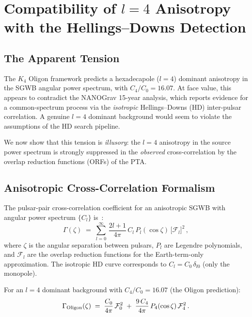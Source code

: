 \section{Compatibility of $l=4$ Anisotropy with the Hellings--Downs Detection}
\label{sec:anisotropy_hd}

\subsection{The Apparent Tension}

The $K_4$ Oligon framework predicts a hexadecapole ($l=4$) dominant anisotropy in the SGWB angular power spectrum, with $C_4/C_0 = 16.07$.  At face value, this appears to contradict the NANOGrav 15-year analysis, which reports evidence for a common-spectrum process via the \emph{isotropic} Hellings--Downs (HD) inter-pulsar correlation.  A genuine $l = 4$ dominant background would seem to violate the assumptions of the HD search pipeline.

We now show that this tension is \emph{illusory}: the $l = 4$ anisotropy in the source power spectrum is strongly suppressed in the \emph{observed} cross-correlation by the overlap reduction functions (ORFs) of the PTA.

\subsection{Anisotropic Cross-Correlation Formalism}

The pulsar-pair cross-correlation coefficient for an anisotropic SGWB with angular power spectrum $\{C_l\}$ is~\cite{Mingarelli2013,Taylor2013}:
\begin{equation}
    \Gamma(\zeta) \;=\; \sum_{l=0}^{\infty}\, \frac{2l+1}{4\pi}\, C_l\, P_l(\cos\zeta)\, \bigl[\mathcal{F}_l\bigr]^2\,,
    \label{eq:aniso_correlation}
\end{equation}
where $\zeta$ is the angular separation between pulsars, $P_l$ are Legendre polynomials, and $\mathcal{F}_l$ are the overlap reduction functions for the Earth-term-only approximation.  The isotropic HD curve corresponds to $C_l = C_0\,\delta_{l0}$ (only the monopole).

For an $l = 4$ dominant background with $C_4/C_0 = 16.07$ (the Oligon prediction):
\begin{equation}
    \Gamma_{\rm Oligon}(\zeta) \;=\; \frac{C_0}{4\pi}\, \mathcal{F}_0^2 \;+\; \frac{9\, C_4}{4\pi}\, P_4(\cos\zeta)\, \mathcal{F}_4^2\,.
    \label{eq:oligon_correlation}
\end{equation}

